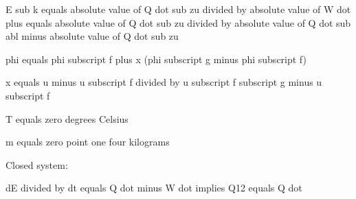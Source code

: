E sub k equals absolute value of Q dot sub zu divided by absolute value of W dot plus equals absolute value of Q dot sub zu divided by absolute value of Q dot sub abl minus absolute value of Q dot sub zu

phi equals phi subscript f plus x (phi subscript g minus phi subscript f)

x equals u minus u subscript f divided by u subscript f subscript g minus u subscript f

T equals zero degrees Celsius

m equals zero point one four kilograms

Closed system:

dE divided by dt equals Q dot minus W dot implies Q12 equals Q dot